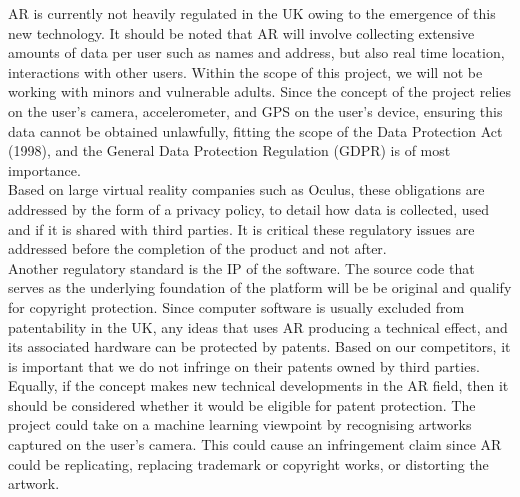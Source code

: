
AR is currently not heavily regulated in the UK owing to the emergence of this new technology. It should be noted that AR will involve collecting extensive amounts of data per user such as names and address, but also real time location, interactions with other users. Within the scope of this project, we will not be working with minors and vulnerable adults. Since the concept of the project relies on the user's camera, accelerometer, and GPS on the user's device, ensuring this data cannot be obtained unlawfully, fitting the scope of the Data Protection Act (1998), and the General Data Protection Regulation (GDPR) is of most importance.\cite{ITProPortal}\\

Based on large virtual reality companies such as Oculus, these obligations are addressed by the form of a privacy policy, to detail how data is collected, used and if it is shared with third parties. It is critical these regulatory issues are addressed before the completion of the product and not after.\\

Another regulatory standard is the IP of the software. The source code that serves as the underlying foundation of the platform will be be original and qualify for copyright protection. Since computer software is usually excluded from patentability in the UK, any ideas that uses AR producing a technical effect, and its associated hardware can be protected by patents. Based on our competitors, it is important that we do not infringe on their patents owned by third parties.\\

Equally, if the concept makes new technical developments in the AR field, then it should be considered whether it would be eligible for patent protection. The project could take on a machine learning viewpoint by recognising artworks captured on the user's camera. This could cause an infringement claim since AR could be replicating, replacing trademark or copyright works, or distorting the artwork.